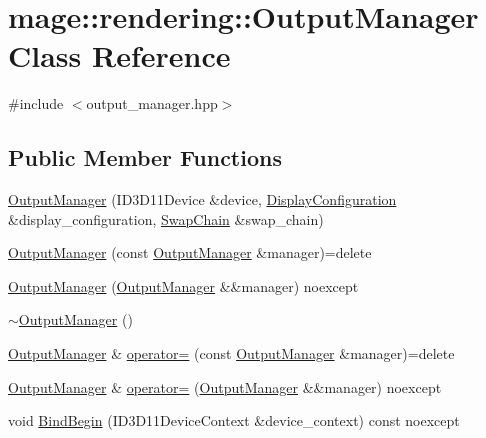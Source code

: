 \hypertarget{classmage_1_1rendering_1_1_output_manager}{}\section{mage\+:\+:rendering\+:\+:Output\+Manager Class Reference}
\label{classmage_1_1rendering_1_1_output_manager}


{\ttfamily \#include $<$output\+\_\+manager.\+hpp$>$}

\subsection*{Public Member Functions}
\begin{DoxyCompactItemize}
\item 
\hyperlink{classmage_1_1rendering_1_1_output_manager_a02c97a57bf7217ab65ff5e7a44602200}{Output\+Manager} (I\+D3\+D11\+Device \&device, \hyperlink{classmage_1_1rendering_1_1_display_configuration}{Display\+Configuration} \&display\+\_\+configuration, \hyperlink{classmage_1_1rendering_1_1_swap_chain}{Swap\+Chain} \&swap\+\_\+chain)
\item 
\hyperlink{classmage_1_1rendering_1_1_output_manager_ae53a8cdec43d7c19dfb0c107814f228b}{Output\+Manager} (const \hyperlink{classmage_1_1rendering_1_1_output_manager}{Output\+Manager} \&manager)=delete
\item 
\hyperlink{classmage_1_1rendering_1_1_output_manager_aeafc4fb1d7a1904776f738b711635832}{Output\+Manager} (\hyperlink{classmage_1_1rendering_1_1_output_manager}{Output\+Manager} \&\&manager) noexcept
\item 
\hyperlink{classmage_1_1rendering_1_1_output_manager_ad2a02128a123be93391c8058ef2b3a0b}{$\sim$\+Output\+Manager} ()
\item 
\hyperlink{classmage_1_1rendering_1_1_output_manager}{Output\+Manager} \& \hyperlink{classmage_1_1rendering_1_1_output_manager_a7fb15ee3d3e3f7be648071ef1c6f3c6d}{operator=} (const \hyperlink{classmage_1_1rendering_1_1_output_manager}{Output\+Manager} \&manager)=delete
\item 
\hyperlink{classmage_1_1rendering_1_1_output_manager}{Output\+Manager} \& \hyperlink{classmage_1_1rendering_1_1_output_manager_a97d2c2be4389a615eb084dd53af531aa}{operator=} (\hyperlink{classmage_1_1rendering_1_1_output_manager}{Output\+Manager} \&\&manager) noexcept
\item 
void \hyperlink{classmage_1_1rendering_1_1_output_manager_a9c753354655b7b218263832c343417d1}{Bind\+Begin} (I\+D3\+D11\+Device\+Context \&device\+\_\+context) const noexcept

\end{DoxyCompactItemize}
